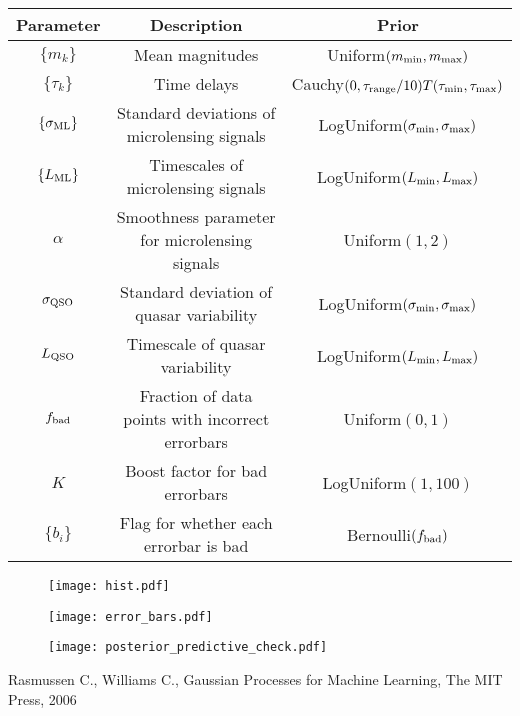 \documentclass[a4paper, 10pt]{article}
\begin{document}
\begin{table}[h!]
\begin{center}
\begin{tabular}{|c|c|c|}
\hline
Parameter & Description & Prior\\
\hline
$\{m_k\}$ & Mean magnitudes & Uniform$(m_{\rm min}, m_{\rm max})$\\
$\{\tau_k\}$ & Time delays & Cauchy$(0, \tau_{\rm range}/10)T(\tau_{\rm min}, \tau_{\rm max})$\\
$\{\sigma_{\rm ML}\}$ & Standard deviations of microlensing signals & LogUniform$(\sigma_{\rm min}, \sigma_{\rm max})$\\
$\{L_{\rm ML}\}$ & Timescales of microlensing signals & LogUniform$(L_{\rm min}, L_{\rm max})$\\
$\alpha$ & Smoothness parameter for microlensing signals & Uniform$(1,2)$\\
$\sigma_{\rm QSO}$ & Standard deviation of quasar variability & LogUniform$(\sigma_{\rm min}, \sigma_{\rm max})$\\
$L_{\rm QSO}$ & Timescale of quasar variability & LogUniform$(L_{\rm min}, L_{\rm max})$\\
$f_{\rm bad}$ & Fraction of data points with incorrect errorbars & Uniform$(0,1)$\\
$K$ & Boost factor for bad errorbars & LogUniform$(1, 100)$\\
$\{b_i\}$ & Flag for whether each errorbar is bad & Bernoulli$(f_{\rm bad})$\\
\hline
\end{tabular}
\end{center}
\end{table}

\begin{figure}
\begin{center}
\texttt{[image: hist.pdf]}
\end{center}
\end{figure}


\begin{figure}
\begin{center}
\texttt{[image: error\_bars.pdf]}
\end{center}
\end{figure}


\begin{figure}
\begin{center}
\texttt{[image: posterior\_predictive\_check.pdf]}
\end{center}
\end{figure}

\begin{thebibliography}{99} 
 Rasmussen C., Williams C., Gaussian Processes for Machine Learning, The MIT Press, 2006
\end{thebibliography}
\end{document}
